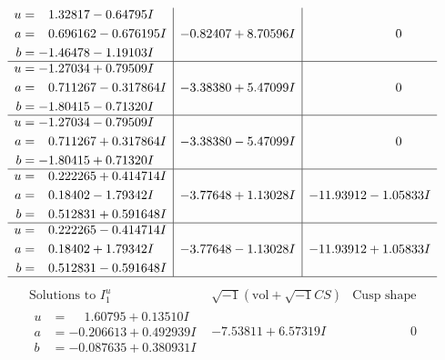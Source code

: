 \documentclass[1p]{elsarticle_modified}
\theoremstyle{definition}
\newcommand{\I}{\sqrt{-1}}
\begin{document}
$$\begin{array}{c|c|c}
\begin{aligned}
u &= \phantom{-}1.32817 - 0.64795 I \\
a &= \phantom{-}0.696162 - 0.676195 I \\
b &= -1.46478 - 1.19103 I\end{aligned}
 & -0.82407 + 8.70596 I & \phantom{-0.000000 } 0 \\ \hline\begin{aligned}
u &= -1.27034 + 0.79509 I \\
a &= \phantom{-}0.711267 - 0.317864 I \\
b &= -1.80415 - 0.71320 I\end{aligned}
 & -3.38380 + 5.47099 I & \phantom{-0.000000 } 0 \\ \hline\begin{aligned}
u &= -1.27034 - 0.79509 I \\
a &= \phantom{-}0.711267 + 0.317864 I \\
b &= -1.80415 + 0.71320 I\end{aligned}
 & -3.38380 - 5.47099 I & \phantom{-0.000000 } 0 \\ \hline\begin{aligned}
u &= \phantom{-}0.222265 + 0.414714 I \\
a &= \phantom{-}0.18402 - 1.79342 I \\
b &= \phantom{-}0.512831 + 0.591648 I\end{aligned}
 & -3.77648 + 1.13028 I & -11.93912 - 1.05833 I \\ \hline\begin{aligned}
u &= \phantom{-}0.222265 - 0.414714 I \\
a &= \phantom{-}0.18402 + 1.79342 I \\
b &= \phantom{-}0.512831 - 0.591648 I\end{aligned}
 & -3.77648 - 1.13028 I & -11.93912 + 1.05833 I\\
 \hline 
 \end{array}$$\newpage$$\begin{array}{c|c|c}  
\text{Solutions to }I^u_{1}& \I (\text{vol} + \sqrt{-1}CS) & \text{Cusp shape}\\
 \hline 
\begin{aligned}
u &= \phantom{-}1.60795 + 0.13510 I \\
a &= -0.206613 + 0.492939 I \\
b &= -0.087635 + 0.380931 I\end{aligned}
 & -7.53811 + 6.57319 I & \phantom{-0.000000 } 0 \\ \hline\begin{aligned}

\end{aligned}
\end{array}$$
\end{document}
